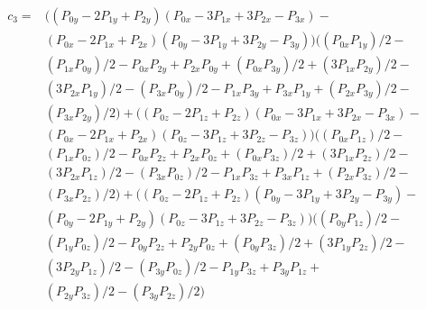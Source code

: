 \documentclass{article}
\begin{document}
\begin{equation}
\begin{aligned}
c_3 =& \big((P_{0y} - 2P_{1y} + P_{2y})(P_{0x} - 3P_{1x} + 3P_{2x} - P_{3x}) - \\ & (P_{0x} - 2P_{1x} + P_{2x})(P_{0y} - 3P_{1y} + 3P_{2y} - P_{3y})\big)\big((P_{0x} P_{1y})/2 - \\
&(P_{1x}P_{0y})/2 - P_{0x}P_{2y} + P_{2x}P_{0y} + (P_{0x}P_{3y})/2 + (3P_{1x}P_{2y})/2 - \\ 
&(3P_{2x}P_{1y})/2 - (P_{3x}P_{0y})/2 - P_{1x}P_{3y} + P_{3x}P_{1y} + (P_{2x}P_{3y})/2 - \\
    &(P_{3x}P_{2y})/2\big) + \big((P_{0z} - 2P_{1z} + P_{2z})(P_{0x} - 3P_{1x} + 3P_{2x} - P_{3x}) - \\
    &(P_{0x} - 2P_{1x} + P_{2x})(P_{0z} - 3P_{1z} + 3P_{2z} - P_{3z})\big)\big((P_{0x}P_{1z})/2 - \\ & (P_{1x}P_{0z})/2 - P_{0x}P_{2z} + P_{2x}P_{0z} + (P_{0x}P_{3z})/2 + (3P_{1x}P_{2z})/2 - \\
    &(3P_{2x}P_{1z})/2 - (P_{3x}P_{0z})/2 - P_{1x}P_{3z} + P_{3x}P_{1z} + (P_{2x}P_{3z})/2 - \\
    &(P_{3x}P_{2z})/2\big) + \big((P_{0z} - 2P_{1z} + P_{2z})(P_{0y} - 3P_{1y} + 3P_{2y} - P_{3y}) - \\
    &(P_{0y} - 2P_{1y} + P_{2y})(P_{0z} - 3P_{1z} + 3P_{2z} - P_{3z})\big)\big((P_{0y}P_{1z})/2 - \\
    &(P_{1y}P_{0z})/2 - P_{0y}P_{2z} + P_{2y}P_{0z} + (P_{0y}P_{3z})/2 + (3P_{1y}P_{2z})/2 - \\
    &(3P_{2y}P_{1z})/2 - (P_{3y}P_{0z})/2 - P_{1y}P_{3z} + P_{3y}P_{1z} + \\
    &(P_{2y}P_{3z})/2 - (P_{3y} P_{2z})/2\big)
\end{aligned}
\end{equation}
\end{document}
